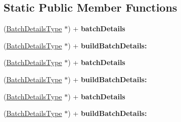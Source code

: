 \subsection*{Static Public Member Functions}
\begin{DoxyCompactItemize}
\item 
\hypertarget{interface_batch_details_type_ae017a3741fcbaa1d492616f75e73a932}{
(\hyperlink{interface_batch_details_type}{BatchDetailsType} $\ast$) + {\bfseries batchDetails}}
\label{interface_batch_details_type_ae017a3741fcbaa1d492616f75e73a932}

\item 
\hypertarget{interface_batch_details_type_aec4f0c4c6d15f341c4314d50cdc1a983}{
(\hyperlink{interface_batch_details_type}{BatchDetailsType} $\ast$) + {\bfseries buildBatchDetails:}}
\label{interface_batch_details_type_aec4f0c4c6d15f341c4314d50cdc1a983}

\item 
\hypertarget{interface_batch_details_type_ae017a3741fcbaa1d492616f75e73a932}{
(\hyperlink{interface_batch_details_type}{BatchDetailsType} $\ast$) + {\bfseries batchDetails}}
\label{interface_batch_details_type_ae017a3741fcbaa1d492616f75e73a932}

\item 
\hypertarget{interface_batch_details_type_aec4f0c4c6d15f341c4314d50cdc1a983}{
(\hyperlink{interface_batch_details_type}{BatchDetailsType} $\ast$) + {\bfseries buildBatchDetails:}}
\label{interface_batch_details_type_aec4f0c4c6d15f341c4314d50cdc1a983}

\item 
\hypertarget{interface_batch_details_type_ae017a3741fcbaa1d492616f75e73a932}{
(\hyperlink{interface_batch_details_type}{BatchDetailsType} $\ast$) + {\bfseries batchDetails}}
\label{interface_batch_details_type_ae017a3741fcbaa1d492616f75e73a932}

\item 
\hypertarget{interface_batch_details_type_aec4f0c4c6d15f341c4314d50cdc1a983}{
(\hyperlink{interface_batch_details_type}{BatchDetailsType} $\ast$) + {\bfseries buildBatchDetails:}}
\label{interface_batch_details_type_aec4f0c4c6d15f341c4314d50cdc1a983}

\end{DoxyCompactItemize}
